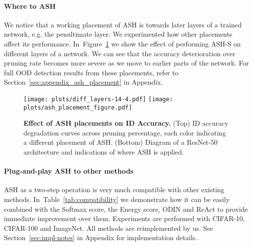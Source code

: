 \documentclass{article}
\newcommand{\figlabel}[1]{\label{fig:#1}}
\newcommand{\figref}[1]{Figure~\ref{fig:#1}}
\newcommand{\secref}[1]{Section~\ref{sec:#1}}
\newcommand{\tabref}[1]{Table~\ref{tab:#1}}
\begin{document}
\paragraph{Where to ASH} We notice that a working placement of ASH is towards later layers of a trained network, e.g. the penultimate layer. We experimented how other placements affect its performance. In~\figref{diff_layers} we show the effect of performing ASH-S on different layers of a network. We can see that the accuracy deterioration over pruning rate becomes more severe as we move to earlier parts of the network. For full OOD detection results from these placements, refer to \secref{appendix_ash_placement} in Appendix. 

\begin{figure}[hbt!]
    \centering 
  	\texttt{[image: plots/diff\_layers-14-4.pdf]}
\texttt{[image: plots/ash\_placement\_figure.pdf]}
	\caption{\textbf{Effect of ASH placements on ID Accuracy.} (Top) ID accuracy degradation curves across pruning percentage, each color indicating a different placement of ASH. (Bottom) Diagram of a ResNet-50 architecture and indications of where ASH is applied. }
	\figlabel{diff_layers}
\end{figure}

\paragraph{Plug-and-play ASH to other methods}
ASH as a two-step operation is very much compatible with other existing methods. In~\tabref{compatibility} we demonstrate how it can be easily combined with the Softmax score, the Energy score, ODIN and ReAct to provide immediate improvement over them. Experiments are performed with CIFAR-10, CIFAR-100 and ImageNet. All methods are reimplemented by us. See \secref{impl-notes} in Appendix for implementation details. 
\end{document}
